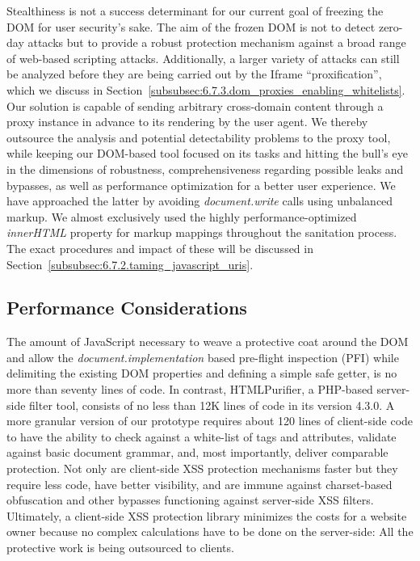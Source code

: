     Stealthiness is not a success determinant for our current goal of freezing the DOM for user security's sake. The aim of the frozen DOM is not to detect zero-day attacks but to provide a robust protection mechanism against a broad range of web-based scripting attacks. Additionally, a larger variety of attacks can still be analyzed before they are being carried out by the Iframe ``proxification'', which we discuss in Section~\ref{subsubsec:6.7.3.dom_proxies_enabling_whitelists}. Our solution is capable of sending arbitrary cross-domain content through a proxy instance in advance to its rendering by the user agent. We thereby outsource the analysis and potential detectability problems to the proxy tool, while keeping our DOM-based tool focused on its tasks and hitting the bull's eye in the dimensions of robustness, comprehensiveness regarding possible leaks and bypasses, as well as performance optimization for a better user experience. We have approached the latter by avoiding \textit{document.write} calls using unbalanced markup. We almost exclusively used the highly performance-optimized \textit{innerHTML} property for markup mappings throughout the sanitation process. The exact procedures and impact of these will be discussed in Section~\ref{subsubsec:6.7.2.taming_javascript_uris}.\\
    
    \subsection{Performance Considerations}
    \label{subsubsec:6.6.8.performance_considerations}

    The amount of JavaScript necessary to weave a protective coat around the DOM and allow the \textit{document.implementation} based pre-flight inspection (PFI) while delimiting the existing DOM properties and defining a simple safe getter, is no more than seventy lines of code. In contrast, HTMLPurifier, a PHP-based server-side filter tool, consists of no less than 12K lines of code in its version 4.3.0. A more granular version of our prototype requires about 120 lines of client-side code to have the ability to check against a white-list of tags and attributes, validate against basic document grammar, and, most importantly, deliver comparable protection. Not only are client-side XSS protection mechanisms faster but they require less code, have better visibility, and are immune against charset-based obfuscation and other bypasses functioning against server-side XSS filters. Ultimately, a client-side XSS protection library minimizes the costs for a website owner because no complex calculations have to be done on the server-side: All the protective work is being outsourced to clients.\\


